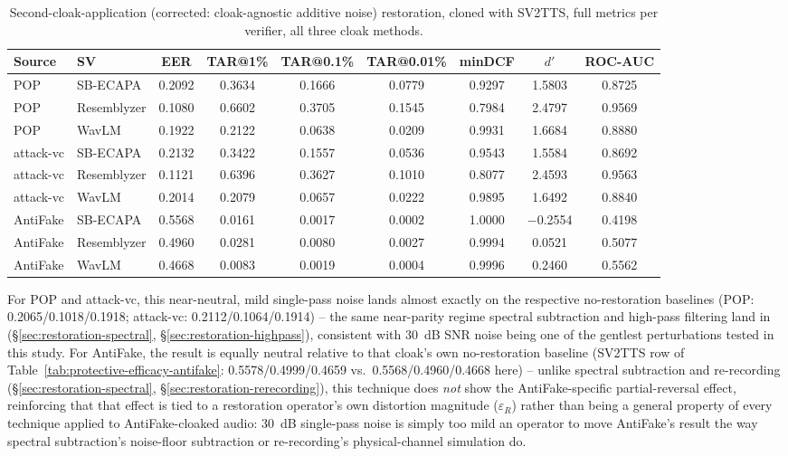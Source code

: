 \documentclass[11pt]{article}
\begin{document}
\begin{table}[H]
\centering
\caption{Second-cloak-application (corrected: cloak-agnostic additive
noise) restoration, cloned with SV2TTS, full metrics per verifier, all
three cloak methods.}
\label{tab:restoration-secondcloak-results}
\begin{tabular}{llccccccc}
\toprule
Source & SV & EER & TAR@1\% & TAR@0.1\% & TAR@0.01\% & minDCF & $d'$ & ROC-AUC \\
\midrule
POP        & SB-ECAPA    & 0.2092 & 0.3634 & 0.1666 & 0.0779 & 0.9297 & 1.5803 & 0.8725 \\
POP        & Resemblyzer & 0.1080 & 0.6602 & 0.3705 & 0.1545 & 0.7984 & 2.4797 & 0.9569 \\
POP        & WavLM       & 0.1922 & 0.2122 & 0.0638 & 0.0209 & 0.9931 & 1.6684 & 0.8880 \\
\addlinespace
attack-vc  & SB-ECAPA    & 0.2132 & 0.3422 & 0.1557 & 0.0536 & 0.9543 & 1.5584 & 0.8692 \\
attack-vc  & Resemblyzer & 0.1121 & 0.6396 & 0.3627 & 0.1010 & 0.8077 & 2.4593 & 0.9563 \\
attack-vc  & WavLM       & 0.2014 & 0.2079 & 0.0657 & 0.0222 & 0.9895 & 1.6492 & 0.8840 \\
\addlinespace
AntiFake   & SB-ECAPA    & 0.5568 & 0.0161 & 0.0017 & 0.0002 & 1.0000 & $-$0.2554 & 0.4198 \\
AntiFake   & Resemblyzer & 0.4960 & 0.0281 & 0.0080 & 0.0027 & 0.9994 & 0.0521 & 0.5077 \\
AntiFake   & WavLM       & 0.4668 & 0.0083 & 0.0019 & 0.0004 & 0.9996 & 0.2460 & 0.5562 \\
\bottomrule
\end{tabular}
\end{table}

For POP and attack-vc, this near-neutral, mild single-pass noise lands
almost exactly on the respective no-restoration baselines (POP:
0.2065/0.1018/0.1918; attack-vc: 0.2112/0.1064/0.1914) -- the same
near-parity regime spectral subtraction and high-pass filtering land in
(\S\ref{sec:restoration-spectral}, \S\ref{sec:restoration-highpass}),
consistent with 30~dB SNR noise being one of the gentlest perturbations
tested in this study. For AntiFake, the result is equally neutral
relative to that cloak's own no-restoration baseline (SV2TTS row of
Table~\ref{tab:protective-efficacy-antifake}: 0.5578/0.4999/0.4659 vs.\
0.5568/0.4960/0.4668 here) -- unlike spectral subtraction and
re-recording (\S\ref{sec:restoration-spectral},
\S\ref{sec:restoration-rerecording}), this technique does \emph{not}
show the AntiFake-specific partial-reversal effect, reinforcing that
that effect is tied to a restoration operator's own distortion
magnitude ($\varepsilon_R$) rather than being a general property of
every technique applied to AntiFake-cloaked audio: 30~dB single-pass
noise is simply too mild an operator to move AntiFake's result the way
spectral subtraction's noise-floor subtraction or re-recording's
physical-channel simulation do.
\end{document}
